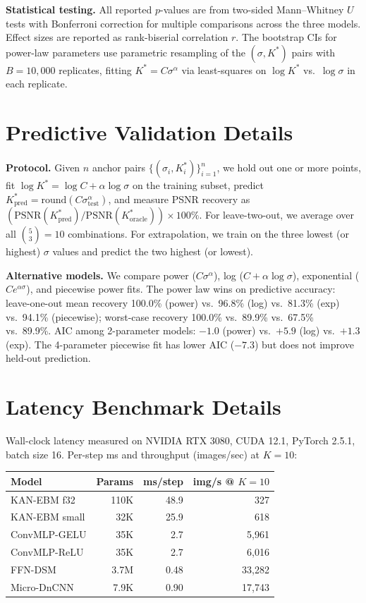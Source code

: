 \documentclass{article}
\begin{document}
\textbf{Statistical testing.} All reported $p$-values are from two-sided Mann--Whitney $U$ tests with Bonferroni correction for multiple comparisons across the three models. Effect sizes are reported as rank-biserial correlation $r$. The bootstrap CIs for power-law parameters use parametric resampling of the $(\sigma, K^*)$ pairs with $B{=}10{,}000$ replicates, fitting $K^* = C\sigma^\alpha$ via least-squares on $\log K^*$ vs.~$\log \sigma$ in each replicate.

\section{Predictive Validation Details}
\label{app:predictive}

\textbf{Protocol.} Given $n$ anchor pairs $\{(\sigma_i, K^*_i)\}_{i=1}^n$, we hold out one or more points, fit $\log K^* = \log C + \alpha \log \sigma$ on the training subset, predict $K^*_{\text{pred}} = \mathrm{round}(C \sigma_{\text{test}}^\alpha)$, and measure PSNR recovery as $(\text{PSNR}(K^*_{\text{pred}}) / \text{PSNR}(K^*_{\text{oracle}})) \times 100\%$. For leave-two-out, we average over all $\binom{5}{3} = 10$ combinations. For extrapolation, we train on the three lowest (or highest) $\sigma$ values and predict the two highest (or lowest).

\textbf{Alternative models.} We compare power ($C\sigma^\alpha$), log ($C + \alpha\log\sigma$), exponential ($C e^{\alpha\sigma}$), and piecewise power fits. The power law wins on predictive accuracy: leave-one-out mean recovery 100.0\% (power) vs.~96.8\% (log) vs.~81.3\% (exp) vs.~94.1\% (piecewise); worst-case recovery 100.0\% vs.~89.9\% vs.~67.5\% vs.~89.9\%. AIC among 2-parameter models: $-1.0$ (power) vs.~$+5.9$ (log) vs.~$+1.3$ (exp). The 4-parameter piecewise fit has lower AIC ($-7.3$) but does not improve held-out prediction.

\section{Latency Benchmark Details}
\label{app:latency}

Wall-clock latency measured on NVIDIA RTX 3080, CUDA 12.1, PyTorch 2.5.1, batch size 16. Per-step ms and throughput (images/sec) at $K{=}10$:
\begin{center}\small
\begin{tabular}{lrrr}
\toprule
Model & Params & ms/step & img/s @ $K{=}10$ \\
\midrule
KAN-EBM f32 & 110K & 48.9 & 327 \\
KAN-EBM small & 32K & 25.9 & 618 \\
ConvMLP-GELU & 35K & 2.7 & 5,961 \\
ConvMLP-ReLU & 35K & 2.7 & 6,016 \\
FFN-DSM & 3.7M & 0.48 & 33,282 \\
Micro-DnCNN & 7.9K & 0.90 & 17,743 \\
\bottomrule
\end{tabular}
\end{center}
\end{document}
